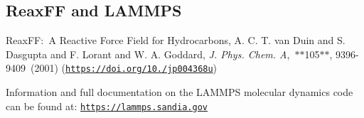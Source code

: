 \subsection*{Reax\+FF and L\+A\+M\+M\+PS}


\begin{DoxyItemize}
\item Reax\+FF\+:  A Reactive Force Field for Hydrocarbons, A. C. T. van Duin and S. Dasgupta and F. Lorant and W. A. Goddard, {\itshape J. Phys. Chem. A}, $\ast$$\ast$105$\ast$$\ast$, 9396-\/9409 (2001) (\href{https://doi.org/10.1021/jp004368u}{\tt https\+://doi.\+org/10./jp004368u})
\item Information and full documentation on the L\+A\+M\+M\+PS molecular dynamics code can be found at\+: \href{https://lammps.sandia.gov}{\tt https\+://lammps.\+sandia.\+gov} 
\end{DoxyItemize}